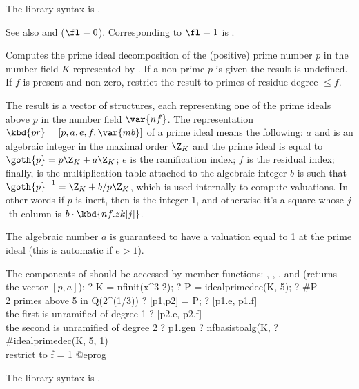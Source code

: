 The library syntax is .

\noindent See also
 and
 ($\fl = 0$).
Corresponding to $\fl=1$ is .

\label{se:idealprimedec}
Computes the prime ideal
decomposition of the (positive) prime number $p$ in the number field $K$
represented by . If a non-prime $p$ is given the result is undefined.
If $f$ is present and non-zero, restrict the result to primes of residue
degree $\leq f$.

The result is a vector of  structures, each representing one of the
prime ideals above $p$ in the number field $\var{nf}$. The representation
$\kbd{pr}=[p,a,e,f,\var{mb}]$ of a prime ideal means the following: $a$ and
is an algebraic integer in the maximal order $\Z_K$ and the prime ideal is
equal to $\goth{p} = p\Z_K + a\Z_K$;
$e$ is the ramification index; $f$ is the residual index;
finally,  is the multiplication table attached to the algebraic
integer $b$ is such that $\goth{p}^{-1}=\Z_K+ b/ p\Z_K$, which is used
internally to compute valuations. In other words if $p$ is inert,
then  is the integer $1$, and otherwise it's a square 
whose $j$-th column is $b \cdot \kbd{nf.zk[j]}$.

The algebraic number $a$ is guaranteed to have a
valuation equal to 1 at the prime ideal (this is automatic if $e>1$).

The components of  should be accessed by member functions: ,
, , and  (returns the vector $[p,a]$):
\bprog
? K = nfinit(x^3-2);
? P = idealprimedec(K, 5);
? #P       \\ 2 primes above 5 in Q(2^(1/3))
? [p1,p2] = P;
? [p1.e, p1.f]    \\ the first is unramified of degree 1
? [p2.e, p2.f]    \\ the second is unramified of degree 2
? p1.gen
? nfbasistoalg(K, %
? #idealprimedec(K, 5, 1) \\ restrict to f = 1
@eprog

The library syntax is .

